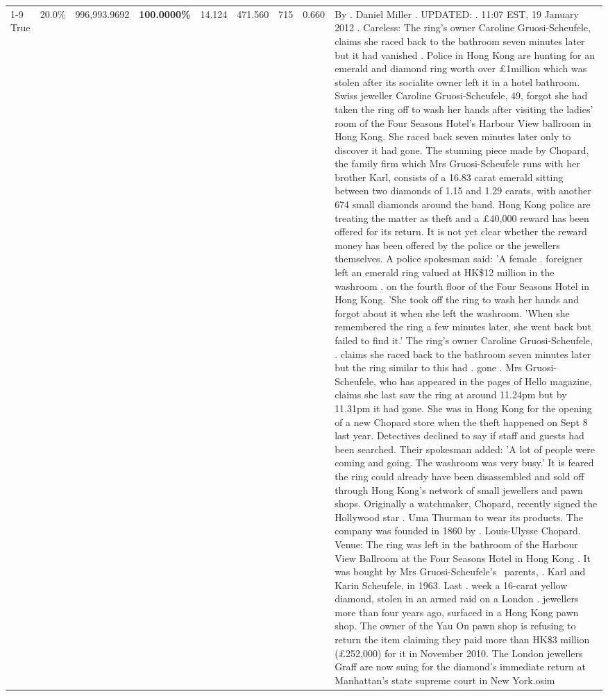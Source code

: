 \begin{table}[H]
\begin{tabular}{lllrlllll}
\cline{1-9}
True & 20.0\% & 996,993.9692 & \bfseries \color{red} 100.0000\% & 14.124 & 471.560 & 715 & 0.660 & By . Daniel Miller . UPDATED: . 11:07 EST, 19 January 2012 . Careless: The ring's owner Caroline Gruosi-Scheufele, claims she raced back to the bathroom seven minutes later but it had vanished . Police in Hong Kong are hunting for an emerald and diamond ring worth over £1million which was stolen after its socialite owner left it in a hotel bathroom. Swiss jeweller Caroline Gruosi-Scheufele, 49, forgot she had taken the ring off to wash her hands after visiting the ladies' room of the Four Seasons Hotel's Harbour View ballroom in Hong Kong. She raced back seven minutes later only to discover it had gone. The stunning piece made by Chopard, the family firm which Mrs Gruosi-Scheufele runs with her brother Karl, consists of a 16.83 carat emerald sitting between two diamonds of 1.15 and 1.29 carats, with another 674 small diamonds around the band. Hong Kong police are treating the matter as theft and a £40,000 reward has been offered for its return. It is not yet clear whether the reward money has been offered by the police or the jewellers themselves. A police spokesman said: 'A female . foreigner left an emerald ring valued at HK\$12 million in the washroom . on the fourth floor of the Four Seasons Hotel in Hong Kong. 'She took off the ring to wash her hands and forgot about it when she left the washroom. 'When she remembered the ring a few minutes later, she went back but failed to find it.' The ring's owner Caroline Gruosi-Scheufele, . claims she raced back to the bathroom seven minutes later but the ring similar to this had . gone . Mrs Gruosi-Scheufele, who has appeared in the pages of Hello magazine, claims she last saw the ring at around 11.24pm but by 11.31pm it had gone. She was in Hong Kong for the opening of a new Chopard store when the theft happened on Sept 8 last year. Detectives declined to say if staff and guests had been searched. Their spokesman added: 'A lot of people were coming and going. The washroom was very busy.' It is feared the ring could already have been disassembled and sold off through Hong Kong's network of small jewellers and pawn shops. Originally a watchmaker, Chopard, recently signed the Hollywood star . Uma Thurman to wear its products. The company was founded in 1860 by . Louis-Ulysse Chopard. Venue: The ring was left in the bathroom of the Harbour View Ballroom at the Four Seasons Hotel in Hong Kong . It was bought by Mrs Gruosi-Scheufele's  parents, . Karl and Karin Scheufele, in 1963. Last . week a 16-carat yellow diamond, stolen in an armed raid on a London . jewellers more than four years ago, surfaced in a Hong Kong pawn shop. The owner of the Yau On pawn shop is refusing to return the item claiming they paid more than HK\$3 million (£252,000) for it in November 2010. The London jewellers Graff are now suing for the diamond’s immediate return at Manhattan’s state supreme court in New York.osim \\

\end{tabular}
\end{table}
